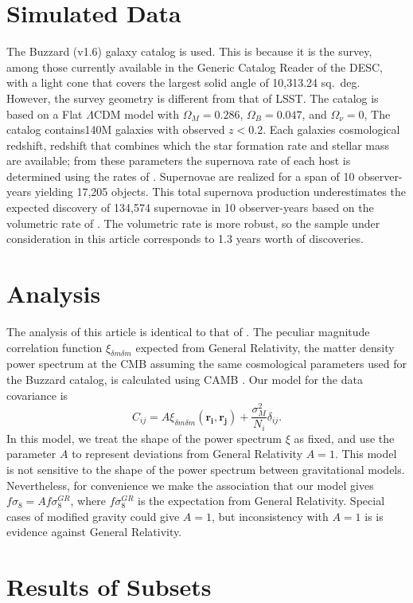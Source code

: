 \documentclass{aastex62}   	%
\begin{document}
\section{Simulated Data}
The Buzzard (v1.6) galaxy catalog is used.  This is because it is the survey, among those currently available
in the Generic Catalog Reader of the DESC, with a light cone that covers the largest solid angle of 10,313.24 sq.~deg.  However,
the survey geometry is different
from that of LSST.  The catalog is based on a Flat $\Lambda$CDM model with $\Omega_M=0.286$, $\Omega_B=0.047$, and
$\Omega_\nu=0$,
The catalog contains140M galaxies with observed $z<0.2$.  Each galaxies cosmological redshift, redshift that combines
which the star formation rate and stellar mass are available; from these  parameters the
supernova rate of each host is determined using the rates of
\citet{2012ApJ...755...61S}.  Supernovae are realized for a span of 10 observer-years yielding 17,205 objects.  This total supernova
production underestimates the expected discovery of 134,574 supernovae in 10 observer-years based on the volumetric
rate of \citet{2010ApJ...713.1026D}.  The volumetric rate is more robust, so the sample under consideration in this article
corresponds to 1.3 years worth of discoveries. 

\section{Analysis}
The analysis of this article is identical to that of \citet{2015JCAP...12..033H, 2017JCAP...05..015H}.   The peculiar magnitude correlation
function $\xi_{\delta m \delta m}$ expected from General Relativity, the matter density power spectrum at the CMB assuming the same
cosmological parameters used for the Buzzard catalog, is calculated using CAMB \citep{Lewis:2002ah}.  Our model for the data covariance
is
\begin{equation}
C_{ij} = A\xi_{\delta m \delta m}(\mathbf{r_i},\mathbf{r_j}) + \frac{\sigma_M^2}{N_i} \delta_{ij}.
\end{equation}
In this model, we treat the shape of the power spectrum $\xi$ as fixed, and use the parameter $A$ to represent
deviations from General Relativity $A=1$.  This model is not sensitive to  the shape of
the power spectrum between gravitational models.  Nevertheless, for
convenience we make the association that our model gives $f\sigma_8 = A f\sigma_8^{GR}$, where $ f\sigma_8^{GR}$ is the expectation
from General Relativity.  Special cases of modified gravity could give $A=1$, but inconsistency with $A=1$ is is evidence against General Relativity.

\section{Results of Subsets}





\end{document}
